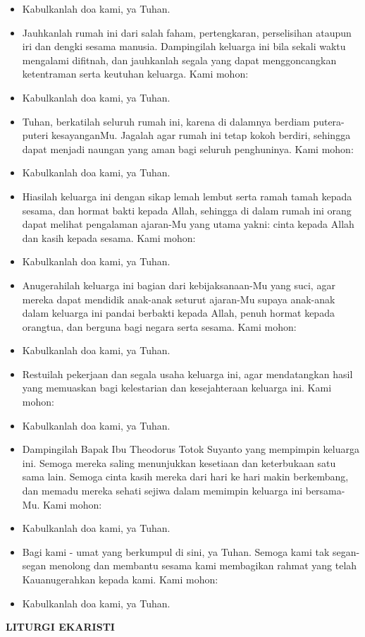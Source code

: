 \documentclass[a4paper,11pt]{scrbook}
\makeatletter
\newcommand{\judul}[1]{%
  {\parindent \z@ \centering 
    \interlinepenalty\@M \Large \bfseries #1\par\nobreak \vskip 20\p@ }}
\newcommand{\BU}[1]{\begin{itemize} \item[U:] #1 \end{itemize}}
\newcommand{\BP}[1]{\begin{itemize} \item[P:] #1 \end{itemize}}
\newcommand{\keluarga}{Theodorus Totok Suyanto }
\makeatother
\begin{document}
\BU{Kabulkanlah doa kami, ya Tuhan.}

\BP{Jauhkanlah rumah ini dari salah faham, pertengkaran, perselisihan ataupun iri dan dengki sesama manusia. Dampingilah keluarga ini bila sekali waktu mengalami difitnah, dan jauhkanlah segala yang dapat menggoncangkan ketentraman serta keutuhan keluarga. Kami mohon:}

\BU{Kabulkanlah doa kami, ya Tuhan.}

\BP{Tuhan, berkatilah seluruh rumah ini, karena di dalamnya berdiam putera-puteri kesayanganMu. Jagalah agar rumah ini tetap kokoh berdiri, sehingga dapat menjadi naungan yang aman bagi seluruh penghuninya. Kami mohon:} 

\BU{Kabulkanlah doa kami, ya Tuhan.}

\BP{Hiasilah keluarga ini dengan sikap lemah lembut serta ramah tamah kepada sesama, dan hormat bakti kepada Allah, sehingga di dalam rumah ini orang dapat melihat pengalaman ajaran-Mu yang utama yakni: cinta kepada Allah dan kasih kepada sesama. Kami mohon:}

\BU{Kabulkanlah doa kami, ya Tuhan.}

\BP{Anugerahilah keluarga ini bagian dari kebijaksanaan-Mu yang suci, agar mereka dapat mendidik anak-anak seturut ajaran-Mu supaya anak-anak dalam keluarga ini pandai berbakti kepada Allah, penuh hormat kepada orangtua, dan berguna bagi negara serta sesama. Kami mohon:}

\BU{Kabulkanlah doa kami, ya Tuhan.}

\BP{Restuilah pekerjaan dan segala usaha keluarga ini, agar mendatangkan hasil yang memuaskan bagi kelestarian dan kesejahteraan keluarga ini. Kami mohon:}

\BU{Kabulkanlah doa kami, ya Tuhan.}

\BP{Dampingilah Bapak Ibu \keluarga yang mempimpin keluarga ini. Semoga mereka saling menunjukkan kesetiaan dan keterbukaan satu sama lain. Semoga cinta kasih mereka dari hari ke hari makin berkembang, dan memadu mereka sehati sejiwa dalam memimpin keluarga ini bersama-Mu. Kami mohon:}

\BU{Kabulkanlah doa kami, ya Tuhan.}

\BP{Bagi kami - umat yang berkumpul di sini, ya Tuhan. Semoga kami tak segan-segan menolong dan membantu sesama kami membagikan rahmat yang telah Kauanugerahkan kepada kami. Kami mohon:}

\BU{Kabulkanlah doa kami, ya Tuhan.}

\judul{LITURGI EKARISTI}
\end{document}
